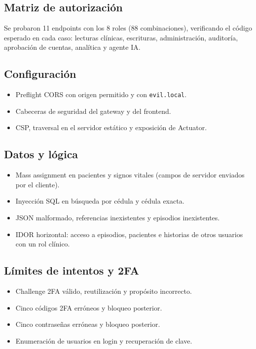 \documentclass[11pt]{article}
\begin{document}
\subsection{Matriz de autorización}

Se probaron 11 endpoints con los 8 roles (88 combinaciones), verificando el
código esperado en cada caso: lecturas clínicas, escrituras, administración,
auditoría, aprobación de cuentas, analítica y agente IA.

\subsection{Configuración}

\begin{itemize}
  \item Preflight CORS con origen permitido y con \texttt{evil.local}.
  \item Cabeceras de seguridad del gateway y del frontend.
  \item CSP, traversal en el servidor estático y exposición de Actuator.
\end{itemize}

\subsection{Datos y lógica}

\begin{itemize}
  \item Mass assignment en pacientes y signos vitales (campos de servidor
  enviados por el cliente).
  \item Inyección SQL en búsqueda por cédula y cédula exacta.
  \item JSON malformado, referencias inexistentes y episodios inexistentes.
  \item IDOR horizontal: acceso a episodios, pacientes e historias de otros
  usuarios con un rol clínico.
\end{itemize}

\subsection{Límites de intentos y 2FA}

\begin{itemize}
  \item Challenge 2FA válido, reutilización y propósito incorrecto.
  \item Cinco códigos 2FA erróneos y bloqueo posterior.
  \item Cinco contraseñas erróneas y bloqueo posterior.
  \item Enumeración de usuarios en login y recuperación de clave.
\end{itemize}
\end{document}
